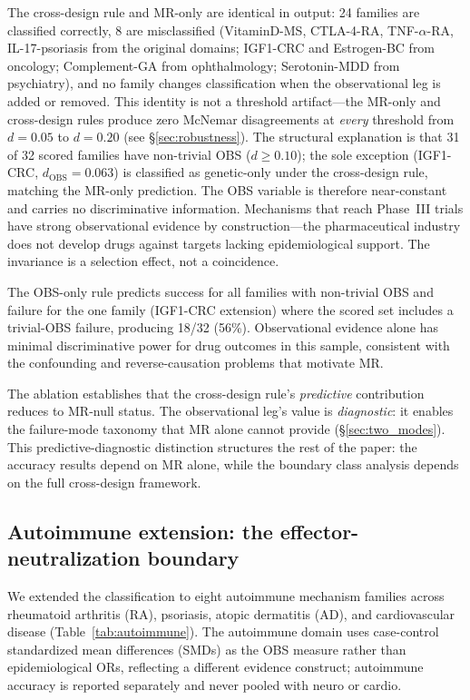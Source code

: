 \documentclass[11pt]{article}
\begin{document}
The cross-design rule and MR-only are identical in output: 24 families are classified correctly, 8 are misclassified (VitaminD-MS, CTLA-4-RA, TNF-$\alpha$-RA, IL-17-psoriasis from the original domains; IGF1-CRC and Estrogen-BC from oncology; Complement-GA from ophthalmology; Serotonin-MDD from psychiatry), and no family changes classification when the observational leg is added or removed. This identity is not a threshold artifact---the MR-only and cross-design rules produce zero McNemar disagreements at \emph{every} threshold from $d = 0.05$ to $d = 0.20$ (see \S\ref{sec:robustness}). The structural explanation is that 31 of 32 scored families have non-trivial OBS ($d \geq 0.10$); the sole exception (IGF1-CRC, $d_{\text{OBS}} = 0.063$) is classified as genetic-only under the cross-design rule, matching the MR-only prediction. The OBS variable is therefore near-constant and carries no discriminative information. Mechanisms that reach Phase~III trials have strong observational evidence by construction---the pharmaceutical industry does not develop drugs against targets lacking epidemiological support. The invariance is a selection effect, not a coincidence.

The OBS-only rule predicts success for all families with non-trivial OBS and failure for the one family (IGF1-CRC extension) where the scored set includes a trivial-OBS failure, producing 18/32 (56\%). Observational evidence alone has minimal discriminative power for drug outcomes in this sample, consistent with the confounding and reverse-causation problems that motivate MR.

The ablation establishes that the cross-design rule's \emph{predictive} contribution reduces to MR-null status. The observational leg's value is \emph{diagnostic}: it enables the failure-mode taxonomy that MR alone cannot provide (\S\ref{sec:two_modes}). This predictive-diagnostic distinction structures the rest of the paper: the accuracy results depend on MR alone, while the boundary class analysis depends on the full cross-design framework.

\subsection{Autoimmune extension: the effector-neutralization boundary}
\label{sec:autoimmune}

We extended the classification to eight autoimmune mechanism families across rheumatoid arthritis (RA), psoriasis, atopic dermatitis (AD), and cardiovascular disease (Table~\ref{tab:autoimmune}). The autoimmune domain uses case-control standardized mean differences (SMDs) as the OBS measure rather than epidemiological ORs, reflecting a different evidence construct; autoimmune accuracy is reported separately and never pooled with neuro or cardio.
\end{document}
